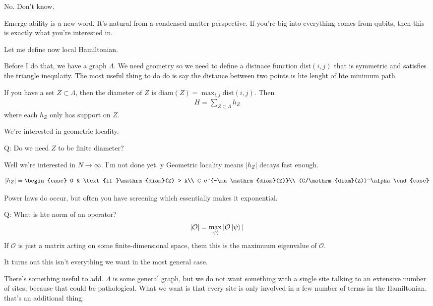 No. Don't know.

Emerge ability is a new word.
It's natural from a condensed matter perspective.
If you're big into everything comes from qubits,
then this is exactly what you're interested in.

Let me define now local Hamiltonian.

Before I do that, we have a graph $\Lambda$.
We need geometry so we need to define a distnace function dist$(i,j)$
that is symmetric and satisfies the triangle inequlaity.
The most useful thing to do do is say the distance between two points is hte
lenght of hte minimum path.

If you have a set $Z\subset \Lambda$,
then the diameter of $Z$ is $\mathrm{diam}(Z)=\max_{i,j}\mathrm{dist}(i, j)$.
Then
\begin{align}
    H = \sum_{Z\subset\Lambda} h_Z
\end{align}
where each $h_Z$ only has support on $Z$.

We're interested in geometric locality.

Q: Do we need $Z$ to be finite diameter?

Well we're interested in $N\to\infty$.
I'm not done yet.
y
Geometric locality means $|h_Z|$ decays fast enough.

\begin{align}
    |h_Z| =
    \begin{case}
        0 & \text{if }\mathrm{diam}(Z) > k\\
        C e^{-\mu \mathrm{diam}(Z)}\\
        (C/\mathrm{diam}(Z))^\alpha
    \end{case}
\end{align}

Power laws do occur, but often you have screening which essentially makes it
exponential.

Q: What is hte norm of an operator?
\begin{align}
    |\mathcal{O}| = \max_{\ket{\psi}} |\mathcal{O}\ket{\psi}|
\end{align}
If $\mathcal{O}$ is just a matrix acting on some finite-dimensional space, them
this is the maximuum eigenvalue of $\mathcal{O}$.

It turns out this isn't everything we want in the most general case.

There's something useful to add.
$\Lambda$ is some general graph,
but we do not want something with a single site talking to an extensive number
of sites,
because that could be pathological.
What we want is that every site is only involved in a few number of terms in the
Hamiltonian.
that's an additional thing.

